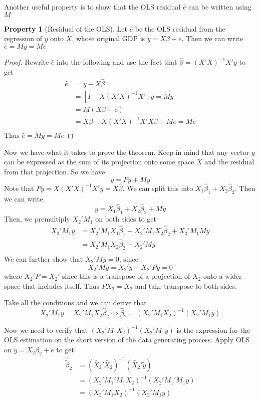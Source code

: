 \documentclass[12pt]{article}
\theoremstyle{definition}
\theoremstyle{property}
\newtheorem{property}{Property}[section]
\theoremstyle{assumption}
\theoremstyle{example}
\theoremstyle{comment}
\begin{document}
Another useful property is to show that the OLS residual $\hat{e}$ can be written using $M$
\begin{mdframed}[backgroundcolor=green!5] 
\begin{property}[Residual of the OLS] 
Let $\hat{e}$ be the OLS residual from the regression of $y$ onto $X$, whose original GDP is $y=X\beta+e$. Then we can write $\hat{e} = My = Me$
\begin{proof}
Rewrite $\hat{e}$ into the following and use the fact that $\hat{\beta}=(X'X)^{-1}X'y$ to get
\begin{align*}
\hat{e} &=y-X\hat{\beta}\\
&=[I-X(X'X)^{-1}X']y = My\\
&=M(X\beta+e)\\
&=X\beta - X(X'X)^{-1}X'X\beta+Me=Me\\
\end{align*}
Thus $\hat{e} = My = Me$
\end{proof}
\end{property}
\end{mdframed}
\par
Now we have what it takes to prove the theorem. Keep in mind that any vector $y$ can be expressed as the sum of its projection onto some space $X$ and the residual from that projection. So we have
\[
y=Py+My
\]
Note that $Py= X(X'X)^{-1}X'y = X\hat{\beta}$. We can split this into $X_1\hat{\beta}_1+X_2\hat{\beta}_2$. Then we can write
\[
y=X_1\hat{\beta}_1+X_2\hat{\beta}_2+My
\]
Then, we premultiply $X_2'M_1$ on both sides to get
\[\begin{aligned}
X_2'M_1y&=X_2'M_1X_1\hat{\beta}_1+X_2'M_1X_2\hat{\beta}_2+X_2'M_1My\\
&=X_2'M_1X_2\hat{\beta}_2+X_2'My\\
\end{aligned}\]
We can further show that $X_2'My=0$, since
\[
X_2'My=X_2'y-X_2'Py=0
\]
where $X_2'P=X_2'$ since this is a transpose of a projection of $X_2$ onto a wider space that includes itself. Thus $PX_2 = X_2$ and take transpose to both sides.  
\par
Take all the conditions and we can derive that 
\[
X_2'M_1y=X_2'M_1X_2\hat{\beta}_2 \iff\hat{\beta}_2 =(X_2'M_1X_2)^{-1}(X_2'M_1y)
\]
\par
Now we need to verify that $(X_2'M_1X_2)^{-1}(X_2'M_1y)$ is the expression for the OLS estimation on the short version of the data generating process. Apply OLS on $\widetilde{y}=\widetilde{X_2}\beta_2 + \widetilde{e}$ to get 
\[
\begin{aligned}
\widehat{\widetilde{\beta}}_2 &= (\widetilde{X_2}'\widetilde{X_2})^{-1}(\widetilde{X_2}'\widetilde{y})\\
&= (X_2'M_1'M_1X_2)^{-1}(X_2'M_1'M_1y)\\
&= (X_2'M_1X_2)^{-1}(X_2'M_1y)\\
\end{aligned}
\]
\end{document}
